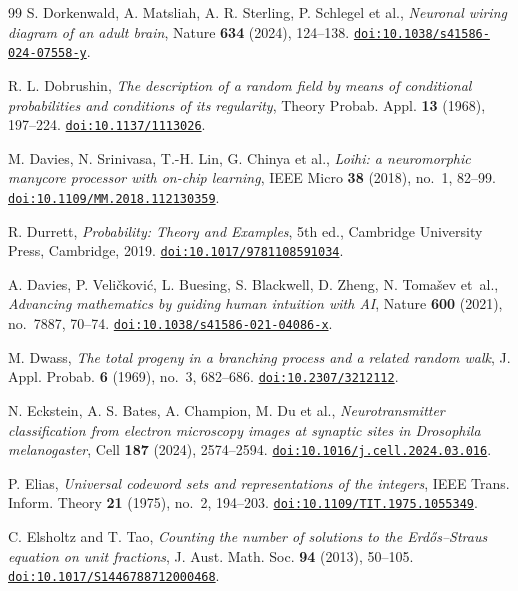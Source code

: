 \begin{thebibliography}{99}
S. Dorkenwald, A. Matsliah, A. R. Sterling, P. Schlegel et al.,
\emph{Neuronal wiring diagram of an adult brain},
Nature \textbf{634} (2024), 124--138.
\href{https://doi.org/10.1038/s41586-024-07558-y}{\nolinkurl{doi:10.1038/s41586-024-07558-y}}.

R. L. Dobrushin,
\emph{The description of a random field by means of conditional probabilities and conditions of its regularity},
Theory Probab. Appl. \textbf{13} (1968), 197--224.
\href{https://doi.org/10.1137/1113026}{\nolinkurl{doi:10.1137/1113026}}.

M. Davies, N. Srinivasa, T.-H. Lin, G. Chinya et al.,
\emph{Loihi: a neuromorphic manycore processor with on-chip learning},
IEEE Micro \textbf{38} (2018), no.~1, 82--99.
\href{https://doi.org/10.1109/MM.2018.112130359}{\nolinkurl{doi:10.1109/MM.2018.112130359}}.

R. Durrett,
\emph{Probability: Theory and Examples}, 5th ed.,
Cambridge University Press, Cambridge, 2019.
\href{https://doi.org/10.1017/9781108591034}{\nolinkurl{doi:10.1017/9781108591034}}.

A. Davies, P. Veli\v{c}kovi\'c, L. Buesing, S. Blackwell, D. Zheng, N. Toma\v{s}ev et~al.,
\emph{Advancing mathematics by guiding human intuition with AI},
Nature \textbf{600} (2021), no.~7887, 70--74.
\href{https://doi.org/10.1038/s41586-021-04086-x}{\nolinkurl{doi:10.1038/s41586-021-04086-x}}.

M. Dwass,
\emph{The total progeny in a branching process and a related random walk},
J. Appl. Probab. \textbf{6} (1969), no.~3, 682--686.
\href{https://doi.org/10.2307/3212112}{\nolinkurl{doi:10.2307/3212112}}.

N. Eckstein, A. S. Bates, A. Champion, M. Du et al.,
\emph{Neurotransmitter classification from electron microscopy images at synaptic sites in Drosophila melanogaster},
Cell \textbf{187} (2024), 2574--2594.
\href{https://doi.org/10.1016/j.cell.2024.03.016}{\nolinkurl{doi:10.1016/j.cell.2024.03.016}}.

P. Elias,
\emph{Universal codeword sets and representations of the integers},
IEEE Trans. Inform. Theory \textbf{21} (1975), no.~2, 194--203.
\href{https://doi.org/10.1109/TIT.1975.1055349}{\nolinkurl{doi:10.1109/TIT.1975.1055349}}.

C. Elsholtz and T. Tao,
\emph{Counting the number of solutions to the Erd\H{o}s--Straus equation on unit fractions},
J. Aust. Math. Soc. \textbf{94} (2013), 50--105.
\href{https://doi.org/10.1017/S1446788712000468}{\nolinkurl{doi:10.1017/S1446788712000468}}.


\end{thebibliography}

